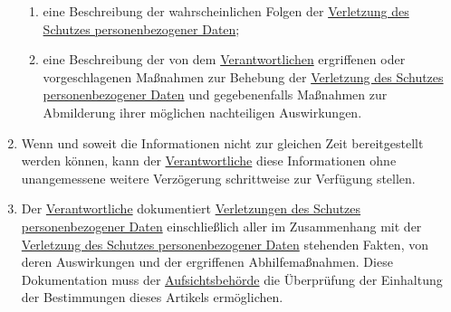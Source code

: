 \begin{enumerate}
\begin{enumerate}
    \item eine Beschreibung der wahrscheinlichen Folgen der \hyperref[itm:04-12]{Verletzung des Schutzes
     personenbezogener Daten};
    \label{itm:33-3c}

    \item eine Beschreibung der von dem \hyperref[itm:04-7]{Verantwortlichen} ergriffenen oder vorgeschlagenen Maßnahmen
     zur Behebung der
     \hyperref[itm:04-12]{Verletzung des Schutzes personenbezogener Daten} und gegebenenfalls Maßnahmen zur Abmilderung
      ihrer möglichen nachteiligen Auswirkungen.
    \label{itm:33-3d}

  \end{enumerate}

  \item Wenn und soweit die Informationen nicht zur gleichen Zeit bereitgestellt werden können, kann der \hyperref
   [itm:04-7]{Verantwortliche} diese Informationen ohne unangemessene weitere Verzögerung schrittweise zur Verfügung
   stellen.
  \label{itm:33-4}

  \item Der \hyperref[itm:04-7]{Verantwortliche} dokumentiert \hyperref[itm:04-12]{Verletzungen des Schutzes
   personenbezogener Daten} einschließlich aller im Zusammenhang mit der \hyperref[itm:04-12]{Verletzung des Schutzes
   personenbezogener Daten} stehenden Fakten, von deren Auswirkungen und der ergriffenen Abhilfemaßnahmen. Diese
   Dokumentation muss der \hyperref[itm:04-21]{Aufsichtsbehörde} die Überprüfung der Einhaltung der Bestimmungen dieses
   Artikels ermöglichen.
  \label{itm:33-5}

\end{enumerate}


